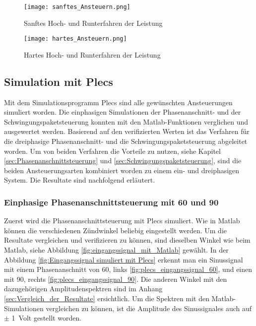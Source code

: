 \begin{figure}[ht!]
	\centering
	\texttt{[image: sanftes\_Ansteuern.png]}	
	\caption{Sanftes Hoch- und Runterfahren der Leistung}
	\label{fig:sanftes_Ansteuern}
\end{figure}
\newpage
\begin{figure}[ht!]
	\centering
	\texttt{[image: hartes\_Ansteuern.png]}	
	\caption{Hartes Hoch- und Runterfahren der Leistung}
	\label{fig:hartes_Ansteuern}
\end{figure}




\newpage
\subsection{Simulation mit Plecs}

Mit dem Simulationsprogramm Plecs sind alle gewünschten Ansteuerungen simuliert worden. Die einphasigen Simulationen der Phasenanschnitt- und der Schwingungspaketsteuerung konnten mit den Matlab-Funktionen verglichen und ausgewertet werden. Basierend auf den verifizierten Werten ist das Verfahren für die dreiphasige Phasenanschnitt- und die Schwingungspaketsteuerung abgeleitet worden. Um von beiden Verfahren die Vorteile zu nutzen, siehe Kapitel \ref{sec:Phasenanschnittsteuerung} und \ref{sec:Schwingungspaketsteuerung}, sind die beiden Ansteuerungsarten kombiniert worden zu einem ein- und dreiphasigen System. Die Resultate sind nachfolgend erläutert.  

\subsubsection{Einphasige Phasenanschnittsteuerung mit 60\textdegree \hspace{0.02cm} und 90\textdegree}

Zuerst wird die Phasenanschnittsteuerung mit Plecs simuliert. Wie in Matlab können die verschiedenen Zündwinkel beliebig eingestellt werden. Um die Resultate vergleichen und verifizieren zu können, sind dieselben Winkel wie beim Matlab, siehe Abbildung \ref{fig:eingangssignal_mit_Matlab} gewählt. In der Abbildung \ref{fig:Eingangssignal simuliert mit Plecs} erkennt man ein Sinussignal mit einem Phasenanschnitt von 60\textdegree \hspace{0.02cm}, links \ref{fig:plecs_eingangssignal_60}, und einen mit 90\textdegree \hspace{0.02cm}, rechts \ref{fig:plecs_eingangssignal_90}. Die anderen Winkel mit den dazugehörigen Amplitudenspektren sind im Anhang \ref{sec:Vergleich_der_Resultate} ersichtlich.
Um die Spektren mit den Matlab-Simulationen vergleichen zu können, ist die Amplitude des Sinussignales auch auf $\pm$ \SI{1}{Volt} gestellt worden.  

